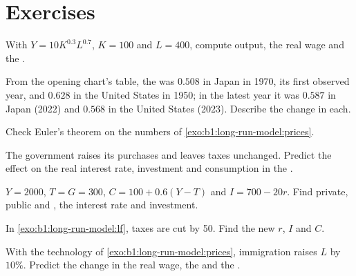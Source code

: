 \section*{Exercises}\label{sec:b1:long-run-model:exercises}

\begin{exercise}[$\star$]\label{exo:b1:long-run-model:prices}
With $Y = 10K^{0.3}L^{0.7}$, $K = 100$ and $L = 400$, compute output, the real wage and
the .
\end{exercise}

\begin{exercise}[$\star$]\label{exo:b1:long-run-model:read}
From the opening chart's table, the  was $0.508$ in Japan in
1970, its first observed year, and $0.628$ in the United States in 1950; in
the latest year it was $0.587$ in Japan (2022) and $0.568$ in the United
States (2023).
Describe the change in each.
\end{exercise}

\begin{exercise}[$\star$]\label{exo:b1:long-run-model:euler-ex}
Check Euler's theorem on the numbers of
\cref{exo:b1:long-run-model:prices}.
\end{exercise}

\begin{exercise}[$\star$]\label{exo:b1:long-run-model:predict}
The government raises its purchases and leaves taxes unchanged. Predict
the effect on the real interest rate, investment and consumption in the
.
\end{exercise}

\begin{exercise}[$\star\star$]\label{exo:b1:long-run-model:lf}
$Y = 2000$, $T = G = 300$, $C = 100 + 0.6(Y - T)$ and $I = 700 - 20r$. Find private,
public and , the interest rate and investment.
\end{exercise}

\begin{exercise}[$\star\star$]\label{exo:b1:long-run-model:taxcut}
In \cref{exo:b1:long-run-model:lf}, taxes are cut by 50. Find the new $r$, $I$
and $C$.
\end{exercise}

\begin{exercise}[$\star\star$]\label{exo:b1:long-run-model:immig}
With the technology of \cref{exo:b1:long-run-model:prices}, immigration
raises $L$ by $10\%$. Predict the change in the real wage, the  and the .
\end{exercise}

